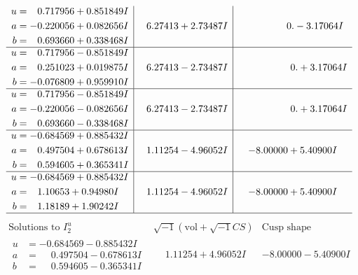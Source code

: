 \documentclass[1p]{elsarticle_modified}
\theoremstyle{definition}
\newcommand{\I}{\sqrt{-1}}
\begin{document}
$$\begin{array}{c|c|c}
\begin{aligned}
u &= \phantom{-}0.717956 + 0.851849 I \\
a &= -0.220056 + 0.082656 I \\
b &= \phantom{-}0.693660 + 0.338468 I\end{aligned}
 & \phantom{-}6.27413 + 2.73487 I & \phantom{-0.000000 } 0. - 3.17064 I \\ \hline\begin{aligned}
u &= \phantom{-}0.717956 - 0.851849 I \\
a &= \phantom{-}0.251023 + 0.019875 I \\
b &= -0.076809 + 0.959910 I\end{aligned}
 & \phantom{-}6.27413 - 2.73487 I & \phantom{-0.000000 -}0. + 3.17064 I \\ \hline\begin{aligned}
u &= \phantom{-}0.717956 - 0.851849 I \\
a &= -0.220056 - 0.082656 I \\
b &= \phantom{-}0.693660 - 0.338468 I\end{aligned}
 & \phantom{-}6.27413 - 2.73487 I & \phantom{-0.000000 -}0. + 3.17064 I \\ \hline\begin{aligned}
u &= -0.684569 + 0.885432 I \\
a &= \phantom{-}0.497504 + 0.678613 I \\
b &= \phantom{-}0.594605 + 0.365341 I\end{aligned}
 & \phantom{-}1.11254 - 4.96052 I & -8.00000 + 5.40900 I \\ \hline\begin{aligned}
u &= -0.684569 + 0.885432 I \\
a &= \phantom{-}1.10653 + 0.94980 I \\
b &= \phantom{-}1.18189 + 1.90242 I\end{aligned}
 & \phantom{-}1.11254 - 4.96052 I & -8.00000 + 5.40900 I\\
 \hline 
 \end{array}$$\newpage$$\begin{array}{c|c|c}  
\text{Solutions to }I^u_{2}& \I (\text{vol} + \sqrt{-1}CS) & \text{Cusp shape}\\
 \hline 
\begin{aligned}
u &= -0.684569 - 0.885432 I \\
a &= \phantom{-}0.497504 - 0.678613 I \\
b &= \phantom{-}0.594605 - 0.365341 I\end{aligned}
 & \phantom{-}1.11254 + 4.96052 I & -8.00000 - 5.40900 I \\ \hline\begin{aligned}

\end{aligned}
\end{array}$$
\end{document}
